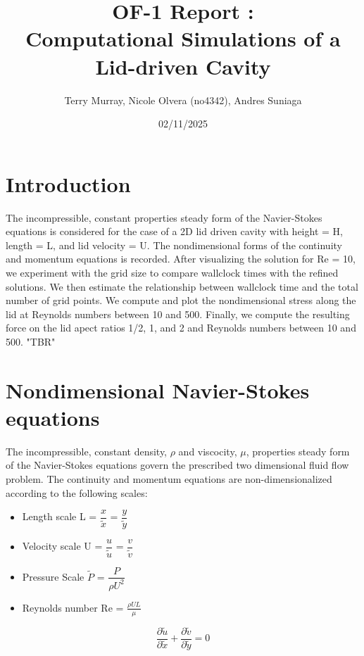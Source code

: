 \documentclass[11pt]{article}
\title{\bf OF-1 Report : \\[2mm] Computational Simulations of a Lid-driven Cavity}
\author{Terry Murray, Nicole Olvera (no4342), Andres Suniaga}
\date{02/11/2025}
\begin{document}
\maketitle

\noindent\makebox[\textwidth]{\rule{\textwidth}{0.2pt}}
\tableofcontents
\noindent\makebox[\textwidth]{\rule{\textwidth}{0.2pt}}
\pagebreak

\section{Introduction}
The incompressible, constant properties steady form of the Navier-Stokes equations is considered for the case of a 2D lid driven cavity with height = H, length = L, and lid velocity = U. 
The nondimensional forms of the continuity and momentum equations is recorded. After visualizing the solution for Re = 10, we experiment with the grid size to compare wallclock times with the refined solutions. 
We then estimate the relationship between wallclock time and the total number of grid points. We compute and plot the nondimensional stress along the lid at Reynolds numbers between 10 and 500. 
Finally, we compute the resulting force on the lid apect ratios 1/2, 1, and 2 and Reynolds numbers between 10 and 500. "TBR"


\section{Nondimensional Navier-Stokes equations}
The incompressible, constant density, $\rho$ and viscocity, $\mu$, properties steady form of the Navier-Stokes equations govern the prescribed two dimensional fluid flow problem. The continuity and momentum equations are non-dimensionalized according to the following scales:
\begin{itemize}
    \item Length scale L = $\dfrac{x}{\tilde{x}}$ = $\dfrac{y}{\tilde{y}}$
    \item Velocity scale U = $\dfrac{u}{\tilde{u}}$ = $\dfrac{v}{\tilde{v}}$
    \item Pressure Scale $\tilde{P}$ = $\dfrac{P}{\rho U^2}$
    \item Reynolds number Re = $\frac{\rho UL}{\mu}$
\end{itemize}

\begin{equation*}
    \frac{\partial \tilde{u}}{\partial \tilde{x}} + \frac{\partial \tilde{v}}{\partial \tilde{y}} = 0
\end{equation*}
\end{document}
